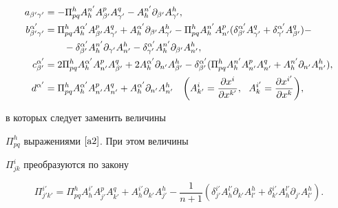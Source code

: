 \begin{align}


a_{\beta'\gamma'}&=-\Pi^{h}_{pq}A^{n'}_{h}A^{p}_{\beta'}A^{q}_{\gamma'}-


A^{n'}_{h}\partial_{\beta'}A^{h}_{\gamma'},\notag \\


%


b^{\alpha'}_{\beta'\gamma'}&=\Pi^h_{pq}A^{\alpha'}_hA^p_{\beta'}A^q_{\gamma'}


+A^{\alpha'}_h\partial_{\beta'}A^h_{\gamma'}-\Pi^h_{pq}A^{n'}_hA^p_{n'}


(\delta^{\alpha'}_{\beta'}A^{q}_{\gamma'}+


\delta^{\alpha'}_{\gamma'} A^{q}_{\beta'})-\notag \\


%


\label{a11}


&\qquad -\delta^{\alpha'}_{\beta'}


A^{n'}_{h}\partial_{\gamma'}A^{h}_{n'}-\delta^{\alpha'}_{\gamma'}


A^{n'}_{h}\partial_{\beta'}A^{h}_{n'},\\


%


c^{\alpha'}_{\beta'}&=2\Pi^{h}_{pq}A^{\alpha'}_{h}A^{p}_{n'}A^{q}_{\beta'}+2


A^{\alpha'}_{h}\partial_{n'}A^{h}_{\beta'}-\delta^{\alpha'}_{\beta'}


(\Pi^{h}_{pq}A^{n'}_{h}A^{p}_{n'}A^{q}_{n'}+A^{n'}_{h}


\partial_{n'}A^{h}_{n'}),\notag \\


%


d^{\alpha'}&=\Pi^{h}_{pq}A^{\alpha'}_{h}A^{p}_{n'}A^{q}_{n'}+


A^{\alpha'}_{h}\partial_{n'}A^{h}_{n'}\quad


\bigg(A^{i}_{k'}=\frac{\partial x^{i}}{


\partial x^{k'}},\ \ A^{i'}_{k}=


\frac{\partial x^{i'}}{\partial x^{k}}\bigg),\notag


\end{align}


в которых следует заменить величины


$\Pi^{h}_{pq}$ выражениями $\eqref{a2}$. При этом величины


$\Pi^{i}_{jk}$ преобразуются по закону 


\begin{equation}\label{a12}


\Pi^{i'}_{j'k'}=\Pi^{h}_{pq}A^{i'}_{h}A^{p}_{j'}A^{q}_{k'}+


A^{i'}_{h}\partial_{k'}A^{h}_{j'}-


\frac{1}{n+1}(\delta^{i'}_{j'}A^{l'}_{h}\partial_{k'}A^{h}_{l'}+


\delta^{i'}_{k'}A^{l'}_{h}\partial_{j'}A^{h}_{l'}).


\end{equation}


